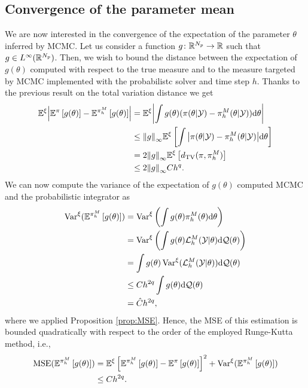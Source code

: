 \subsection{Convergence of the parameter mean}\label{sec:ParH}
We are now interested in the convergence of the expectation of the parameter $\theta$ inferred by MCMC. Let us consider a function $g \colon \mathbb{R}^{N_p} \to \mathbb{R}$ such that $g \in L^\infty(\mathbb{R}^{N_p})$. Then, we wish to bound the distance between the expectation of $g(\theta)$ computed with respect to the true measure and to the measure targeted by MCMC implemented with the probabilistc solver and time step $h$. Thanks to the previous result on the total variation distance we get
\begin{equation}
\begin{aligned}
	\mathbb{E}^\xi\abs{\mathbb{E}^\pi\left[g(\theta)\right] - \mathbb{E}^{\pi_h^M}\left[g(\theta)\right]} &= \mathbb{E}^\xi\abs{\int g(\theta)(\pi(\theta|\mathcal{Y}) - \pi_h^M(\theta|\mathcal{Y}))\dd \theta}\\
	&\leq \norm{g}_\infty \mathbb{E}^\xi \left[\int \abs{\pi(\theta|\mathcal{Y}) - \pi_h^M(\theta|\mathcal{Y})} \dd \theta\right] \\
	&= 2 \norm{g}_\infty \mathbb{E}^\xi\left[d_{\mathrm{TV}}(\pi, \pi_h^M)\right] \\
	&\leq 2 \norm{g}_\infty C h^{q}.
\end{aligned}
\end{equation}
We can now compute the variance of the expectation of $g(\theta)$ computed MCMC and the probabilistic integrator as
\begin{equation}
\begin{aligned}
	\operatorname{Var}^\xi (\mathbb{E}^{\pi_h^M}\left[g(\theta)\right]) &= \operatorname{Var}^\xi \left(\int g(\theta) \pi^M_h (\theta) \dd \theta \right) \\
	&= \operatorname{Var}^\xi \left(\int g(\theta) \mathcal{L}^M_h (\mathcal{Y}|\theta) \dd \mathcal{Q}(\theta) \right) \\
	&= \int g(\theta) \operatorname{Var}^\xi(\mathcal{L}^M_h (\mathcal{Y}|\theta)) \dd \mathcal{Q}(\theta) \\
	&\leq Ch^{2q} \int g(\theta) \dd \mathcal{Q}(\theta) \\
	&= \hat C h^{2q},
\end{aligned}
\end{equation}
where we applied Proposition \ref{prop:MSE}. Hence, the MSE of this estimation is bounded quadratically with respect to the order of the employed Runge-Kutta method, i.e.,  
\begin{equation}
\begin{aligned}
	\operatorname{MSE}(\mathbb{E}^{\pi_h^M}\left[g(\theta)\right]) &= \mathbb{E}^\xi\left[\mathbb{E}^{\pi_h^M}\left[g(\theta)\right] - \mathbb{E}^{\pi}\left[g(\theta)\right]\right]^2 + \operatorname{Var}^\xi(\mathbb{E}^{\pi_h^M}\left[g(\theta)\right]) \\
	&\leq C h^{2q}.
\end{aligned}
\end{equation}

